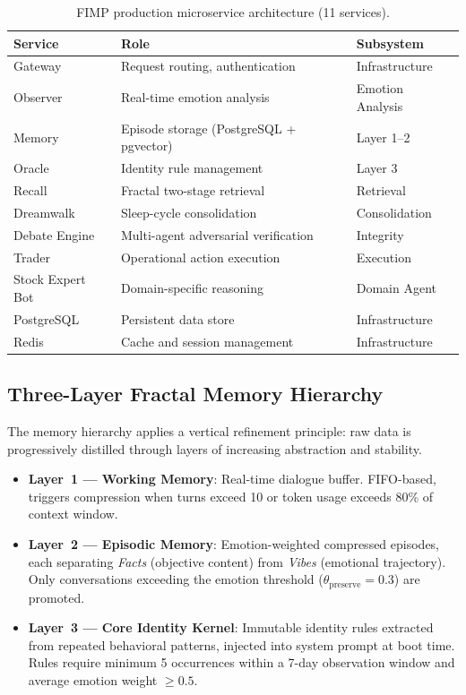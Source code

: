 \documentclass[11pt,a4paper]{article}
\begin{document}
\begin{table}[h]
\centering
\caption{FIMP production microservice architecture (11 services).}
\label{tab:services}
\small
\begin{tabular}{@{}lll@{}}
\toprule
\textbf{Service} & \textbf{Role} & \textbf{Subsystem} \\
\midrule
Gateway & Request routing, authentication & Infrastructure \\
Observer & Real-time emotion analysis & Emotion Analysis \\
Memory & Episode storage (PostgreSQL + pgvector) & Layer 1--2 \\
Oracle & Identity rule management & Layer 3 \\
Recall & Fractal two-stage retrieval & Retrieval \\
Dreamwalk & Sleep-cycle consolidation & Consolidation \\
Debate Engine & Multi-agent adversarial verification & Integrity \\
Trader & Operational action execution & Execution \\
Stock Expert Bot & Domain-specific reasoning & Domain Agent \\
PostgreSQL & Persistent data store & Infrastructure \\
Redis & Cache and session management & Infrastructure \\
\bottomrule
\end{tabular}
\end{table}

\subsection{Three-Layer Fractal Memory Hierarchy}

The memory hierarchy applies a vertical refinement principle: raw data is progressively distilled through layers of increasing abstraction and stability.

\begin{itemize}[itemsep=3pt]
  \item \textbf{Layer~1 --- Working Memory}: Real-time dialogue buffer. FIFO-based, triggers compression when turns exceed 10 or token usage exceeds 80\% of context window.
  \item \textbf{Layer~2 --- Episodic Memory}: Emotion-weighted compressed episodes, each separating \emph{Facts} (objective content) from \emph{Vibes} (emotional trajectory). Only conversations exceeding the emotion threshold ($\theta_{\text{preserve}} = 0.3$) are promoted.
  \item \textbf{Layer~3 --- Core Identity Kernel}: Immutable identity rules extracted from repeated behavioral patterns, injected into system prompt at boot time. Rules require minimum 5 occurrences within a 7-day observation window and average emotion weight $\geq 0.5$.
\end{itemize}
\end{document}

